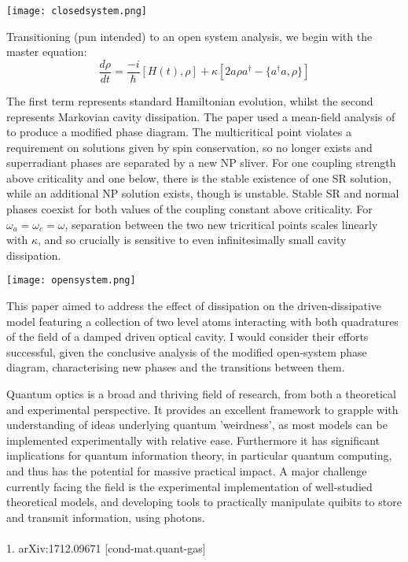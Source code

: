  \texttt{[image: closedsystem.png]}

Transitioning (pun intended) to an open system analysis, we begin with the master equation:
 \begin{equation}
 \frac{d\rho}{d t} = \frac{-i}{\hbar}[H(t),\rho]+\kappa[2a\rho a^{\dagger}-\{a^{\dagger}a,\rho\}]
 \end{equation}

The first term represents standard Hamiltonian evolution, whilst the second represents Markovian cavity dissipation. The paper used a mean-field analysis of to produce a modified phase diagram. The multicritical point violates a requirement on solutions given by spin conservation, so no longer exists and superradiant phases are separated by a new NP sliver. For one coupling strength above criticality and one below, there is the stable existence of one SR solution, while an additional NP solution exists, though is unstable. Stable SR and normal phases coexist for both values of the coupling constant above criticality. For $\omega_{a}=\omega_{c}=\omega$, separation between the two new tricritical points scales linearly with $\kappa$, and so crucially is sensitive to even infinitesimally small cavity dissipation.

\texttt{[image: opensystem.png]}

This paper aimed to address the effect of dissipation on the driven-dissipative model featuring a collection of two level atoms interacting with both quadratures of the field of a damped driven optical cavity. I would consider their efforts successful, given the conclusive analysis of the modified open-system phase diagram, characterising new phases and the transitions between them.

Quantum optics is a broad and thriving field of research, from both a theoretical and experimental perspective. It provides an excellent framework to grapple with understanding of ideas underlying quantum 'weirdness', as most models can be implemented experimentally with relative ease. Furthermore it has significant implications for quantum information theory, in particular quantum computing, and thus has the potential for massive practical impact. A major challenge currently facing the field is the experimental implementation of well-studied theoretical models, and developing tools to practically manipulate quibits to store and transmit information, using photons. 
\\
\\1. 	arXiv:1712.09671 [cond-mat.quant-gas]


